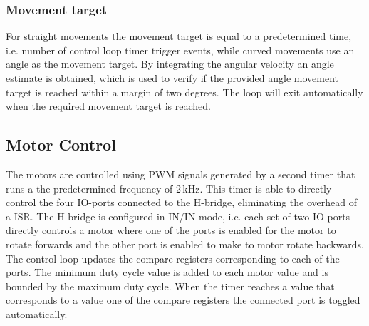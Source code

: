 \subsubsection{Movement target}

For straight movements the movement target is equal to a predetermined time, i.e. number of control loop timer trigger events, while curved movements use an angle as the movement target.
By integrating the angular velocity an angle estimate is obtained, which is used to verify if the provided angle movement target is reached within a margin of two degrees.
The loop will exit automatically when the required movement target is reached.

\subsection{Motor Control}
The motors are controlled using PWM signals generated by a second timer that runs a the predetermined frequency of 2\,kHz.
This timer is able to directly-control the four IO-ports connected to the H-bridge, eliminating the overhead of a ISR.
The H-bridge is configured in IN/IN mode, i.e. each set of two IO-ports directly controls a motor where one of the ports is enabled for the motor to rotate forwards and the other port is enabled to make to motor rotate backwards.
The control loop updates the compare registers corresponding to each of the ports.
The minimum duty cycle value is added to each motor value and is bounded by the maximum duty cycle.
When the timer reaches a value that corresponds to a value one of the compare registers the connected port is toggled automatically.


